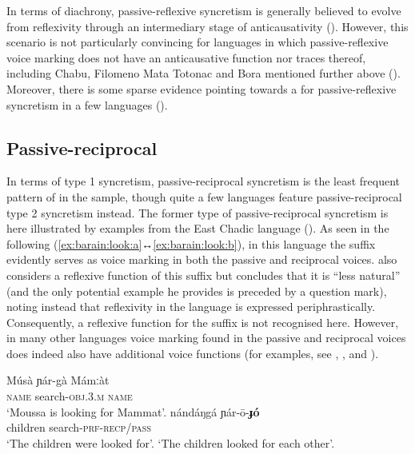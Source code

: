 In terms of diachrony, passive-reflexive syncretism is generally believed to evolve from reflexivity through an intermediary stage of anticausativity (). However, this scenario is not particularly convincing for languages in which passive-reflexive voice marking does not have an anticausative function nor traces thereof, including Chabu, Filomeno Mata Totonac and Bora mentioned further above (). Moreover, there is some sparse evidence pointing towards a  for passive-reflexive syncretism in a few languages ().

\subsection{Passive-reciprocal} \label{sec:simple-syncretism:pass-recp}
In terms of type 1 syncretism, passive-reciprocal syncretism is the least frequent pattern of  in the sample, though quite a few languages feature passive-reciprocal type 2 syncretism instead. The former type of passive-reciprocal syncretism is here illustrated by examples from the East Chadic language  (). As seen in the following  (\ref{ex:barain:look:a}↔\ref{ex:barain:look:b}), in this language the suffix  evidently serves as voice marking in both the passive and reciprocal voices. \cite[148ff.]{lovestrand:2012} also considers a reflexive function of this suffix but concludes that it is “less natural” (and the only potential example he provides is preceded by a question mark), noting instead that reflexivity in the language is expressed periphrastically. Consequently, a reflexive function for the suffix  is not recognised here. However, in many other languages voice marking found in the passive and reciprocal voices does indeed also have additional voice functions (for examples, see , , and ).

\ea {} \citep[137, 150]{lovestrand:2012}
\ea\label{ex:barain:look:a}
	\gll	Músà ɲár-gà Mámːàt \\
			\textsc{name} search-\textsc{obj.3.m} \textsc{name} \\
	\glt	‘Moussa is looking for Mammat’.
\ex\label{ex:barain:look:b}
	\gll	nándáŋgá ɲár-ō-\textbf{ɟó} \\
			children search-\textsc{prf-recp/pass} \\
	\glt	‘The children were looked for’.
	\glt	‘The children looked for each other’.
	\z 
\z

